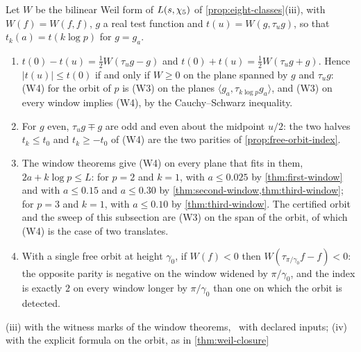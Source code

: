 \begin{proposition}\label{prop:W4-from-W3}
Let $W$ be the bilinear Weil form of $L(s,\chi_5)$ of \cref{prop:eight-classes}\textup{(iii)}, with $W(f)=W(f,f)$, $g$ a real test function and $t(u)=W(g,\tau_ug)$, so that
$t_k(a)=t(k\log p)$ for $g=g_a$.
\begin{enumerate}[label=\textup{(\roman*)}]
  \item $t(0)-t(u)=\tfrac12W(\tau_ug-g)$ and $t(0)+t(u)=\tfrac12W(\tau_ug+g)$.  Hence $|t(u)|\le t(0)$ if and only
    if $W\ge0$ on the plane spanned by $g$ and $\tau_ug$: \textup{(W4)} for the orbit of $p$ is \textup{(W3)} on
    the planes $\langle g_a,\tau_{k\log p}g_a\rangle$, and \textup{(W3)} on every window implies \textup{(W4)}, by
    the Cauchy--Schwarz inequality.
  \item For $g$ even, $\tau_ug\mp g$ are odd and even about the midpoint $u/2$: the two halves
    $t_k\le t_0$ and $t_k\ge-t_0$ of \textup{(W4)} are the two parities of \cref{prop:free-orbit-index}.
  \item The window theorems give \textup{(W4)} on every plane that fits in them, $2a+k\log p\le L$: for $p=2$ and
    $k=1$, with $a\le0.025$ by \cref{thm:first-window} and with $a\le0.15$ and $a\le0.30$ by
    \cref{thm:second-window,thm:third-window}; for $p=3$ and $k=1$, with $a\le0.10$ by \cref{thm:third-window}.  The
    certified orbit and the sweep of this subsection are \textup{(W3)} on the span of the orbit, of which \textup{(W4)}
    is the case of two translates.
  \item With a single free orbit at height $\gamma_0$, if $W(f)<0$ then $W(\tau_{\pi/\gamma_0}f-f)<0$: the opposite parity is
    negative on the window widened by $\pi/\gamma_0$, and the index is exactly $2$ on every window longer by $\pi/\gamma_0$ than
    one on which the orbit is detected.
\end{enumerate}


(iii) with the witness marks of the window theorems, \ with declared inputs;
(iv) with the explicit formula on the orbit, as in \cref{thm:weil-closure}
\end{proposition}
